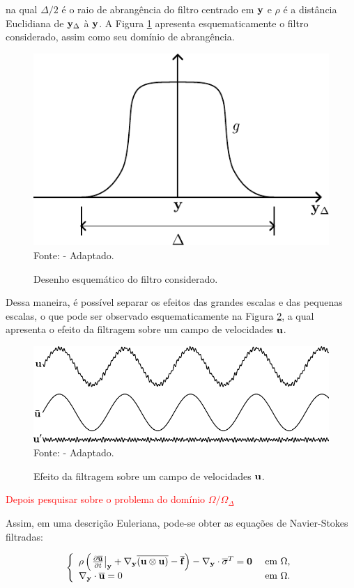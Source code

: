\documentclass[_ArquivoPrincipal.tex]{subfiles}
\begin{document}
\noindent na qual $\Delta/2$ é o raio de abrangência do filtro centrado em $\mathbf{y}$ e $\rho$ é a distância Euclidiana de $\mathbf{y}_\Delta$ à $\mathbf{y}$. A Figura \ref{fig:Filtro} apresenta esquematicamente o filtro considerado, assim como seu domínio de abrangência.

\begin{figure}[h]
    \centering
    \caption{Desenho esquemático do filtro considerado.}
    \includegraphics[width=0.5\linewidth]{Figuras/filtro.pdf}
    \\Fonte:  - Adaptado.
    \label{fig:Filtro}
\end{figure}

Dessa maneira, é possível separar os efeitos das grandes escalas e das pequenas escalas, o que pode ser observado esquematicamente na Figura \ref{fig:EfeitoFiltragem}, a qual apresenta o efeito da filtragem sobre um campo de velocidades $\mathbf{u}$.

\begin{figure}[h]
    \centering
    \caption{Efeito da filtragem sobre um campo de velocidades $\mathbf{u}$.}
    \includegraphics[width=.75\linewidth]{Figuras/efeito_filtragem.pdf}
    \\Fonte:  - Adaptado.
    \label{fig:EfeitoFiltragem}
\end{figure}

\textcolor{red}{Depois pesquisar sobre o problema do domínio $\Omega/\Omega_\Delta$}

Assim, em uma descrição Euleriana, pode-se obter as equações de Navier-Stokes filtradas:

\begin{equation}
    \left\{
   \begin{array}{ll}
        \rho\left(\left.\frac{\partial{\overline{\mathbf{u}}}}{\partial{t}}\right|_{\mathbf{y}}+\mathbf{\nabla_y}\overline{(\mathbf{u}\otimes\mathbf{u})}-\overline{\mathbf{f}}\right)-\mathbf{\nabla_y}\cdot\overline{\mathbf{\sigma}}^T=\mathbf{0}&\text{ em }\Omega\text{,}\\
        \mathbf{\nabla_y}\cdot\overline{\mathbf{u}}=0&\text{ em }\Omega\text{.}
    \end{array}
    \right.
\end{equation}
\end{document}
